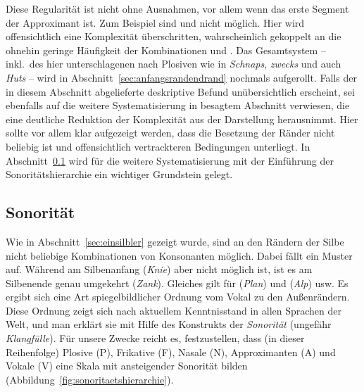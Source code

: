 \begin{exe}
  \ex\label{ex:phol4717}
  \begin{xlist}
  \end{xlist}
\end{exe}

Diese Regularität ist nicht ohne Ausnahmen, vor allem wenn das erste Segment der Approximant ist.
Zum Beispiel sind \textipa{[lmp]} und \textipa{[lnS]} nicht möglich.
Hier wird offensichtlich eine Komplexität überschritten, wahrscheinlich gekoppelt an die ohnehin geringe Häufigkeit der Kombinationen \textipa{[lm]} und \textipa{[lm]}.
Das Gesamtsystem -- inkl.\ des hier unterschlagenen \textipa{[s]} nach Plosiven wie in \textit{Schnaps}, \textit{zwecks} und auch \textit{Huts} -- wird in Abschnitt~\ref{sec:anfangsrandendrand} nochmals aufgerollt.
Falls der in diesem Abschnitt abgelieferte deskriptive Befund unübersichtlich erscheint, sei ebenfalls auf die weitere Systematisierung in besagtem Abschnitt verwiesen, die eine deutliche Reduktion der Komplexität aus der Darstellung herausnimmt.
Hier sollte vor allem klar aufgezeigt werden, dass die Besetzung der Ränder nicht beliebig ist und offensichtlich vertrackteren Bedingungen unterliegt.
In Abschnitt~\ref{sec:sonoritaet} wird für die weitere Systematisierung mit der Einführung der Sonoritätshierarchie ein wichtiger Grundstein gelegt.



\subsection{Sonorität}

\label{sec:sonoritaet}

Wie in Abschnitt~\ref{sec:einsilbler} gezeigt wurde, sind an den Rändern der Silbe nicht beliebige Kombinationen von Konsonanten möglich.
Dabei fällt ein Muster auf.
Während am Silbenanfang \zB \textipa{[kn]} (\textit{Knie}) aber nicht \textipa{[nk]} möglich ist, ist es am Silbenende genau umgekehrt (\textit{Zank}).
Gleiches gilt für \textipa{[pl]} (\textit{Plan}) und \textipa{[lp]} (\textit{Alp}) usw.
Es ergibt sich eine Art spiegelbildlicher Ordnung vom Vokal zu den Außenrändern.
Diese Ordnung zeigt sich nach aktuellem Kenntnisstand in allen Sprachen der Welt, und man erklärt sie mit Hilfe des Konstrukts der \textit{Sonorität} (ungefähr \textit{Klangfülle}).
Für unsere Zwecke reicht es, festzustellen, dass (in dieser Reihenfolge) Plosive (P), Frikative (F), Nasale (N), Approximanten (A) und Vokale (V) eine Skala mit ansteigender Sonorität bilden (Abbildung~\ref{fig:sonoritaetshierarchie}).


